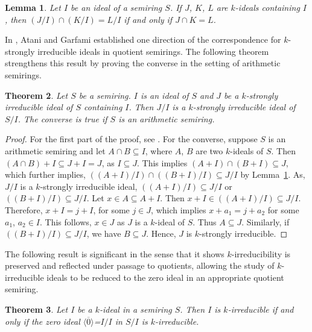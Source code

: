 \documentclass[11pt,english]{amsart}
\newtheorem{theorem}{Theorem}[section]
\newtheorem{lemma}[theorem]{Lemma}
\theoremstyle{definition}
\numberwithin{equation}{section}
\begin{document}
\begin{lemma}\label{loc13}
    Let $I$ be an ideal of a semiring $S$. If $J$, $K$, $L$ are $k$-ideals containing $I$, then $(J/I)\cap (K/I)=L/I$ if and only if $J\cap K=L$.
\end{lemma}

In \cite[Theorem 2.7]{AtaniGarfami13}, Atani and Garfami established one direction of the correspondence for $k$-strongly irreducible ideals in quotient semirings. The following theorem strengthens this result by proving the converse in the setting of arithmetic semirings.
\begin{theorem}\label{k-strongly irreducible ideals in quotient semirings}
    Let $S$ be a semiring. $I$ is an ideal of $S$ and $J$ be a $k$-strongly irreducible ideal of $S$ containing $I$. Then $J/I$ is a $k$-strongly irreducible ideal of $S/I$. The converse is true if $S$ is an arithmetic semiring.
\end{theorem}

\begin{proof}
    For the first part of the proof, see \cite[Theorem 2.7]{AtaniGarfami13}.
For the converse, suppose $S$ is an arithmetic semiring and let $A\cap B \subseteq I$, where $A$, $B$ are two $k$-ideals of $S$. Then $(A\cap B)+I\subseteq J+I=J$, as $I\subseteq J$. This implies $(A+I) \cap (B+I) \subseteq J$, which further implies, $((A+I)/I)\cap ((B+I)/I) \subseteq J/I$ by Lemma~\ref{loc13}. As, $J/I$ is a $k$-strongly irreducible ideal, $((A+I)/I) \subseteq J/I$ or $((B+I)/I) \subseteq J/I$. Let $x \in A \subseteq A+I$. Then $x+I \in ((A+I)/I) \subseteq J/I$. Therefore, $x+I = j+I$, for some $j \in J$, which implies $x+a_1=j+a_2$ for some $a_1$, $a_2 \in I$. This follows, $x \in J$ as $J$ is a $k$-ideal of $S$. Thus $A \subseteq J$. Similarly, if $((B+I)/I) \subseteq J/I$, we have $B \subseteq J$. Hence, $J$ is $k$-strongly irreducible.
\end{proof}

The following result is significant in the sense that it shows $k$-irreducibility is preserved and reflected under passage to quotients, allowing the study of $k$-irreducible ideals to be reduced to the zero ideal in an appropriate quotient semiring.

\begin{theorem}
    Let $I$ be a $k$-ideal in a semiring $S$. Then $I$ is $k$-irreducible if and only if the zero ideal $\langle \overline{0}\rangle$=$I/I$ in $S/I$ is $k$-irreducible.
\end{theorem}
\end{document}
